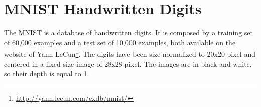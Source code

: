 \section{MNIST Handwritten Digits}
\label{sec:mnist}

The MNIST is a database of handwritten digits.
It is composed by a training set of 60,000 examples and a test set of 10,000 examples, both available on the website of Yann LeCun\footnote{\url{http://yann.lecun.com/exdb/mnist/}}.
The digits have been size-normalized to 20x20 pixel and centered in a fixed-size image of 28x28 pixel.
The images are in black and white, so their depth is equal to 1.
